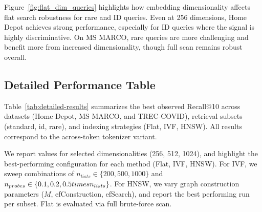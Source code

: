 \documentclass[manuscript]{acmart}
\begin{document}
Figure~\ref{fig:flat_dim_queries} highlights how embedding dimensionality affects flat search robustness for rare and ID queries. Even at 256 dimensions, Home Depot achieves strong performance, especially for ID queries where the signal is highly discriminative. On MS MARCO, rare queries are more challenging and benefit more from increased dimensionality, though full scan remains robust overall.

\subsection{Detailed Performance Table}

Table~\ref{tab:detailed-results} summarizes the best observed Recall@10 across datasets (Home Depot, MS MARCO, and TREC-COVID), retrieval subsets (standard, id, rare), and indexing strategies (Flat, IVF, HNSW). All results correspond to the across-token tokenizer variant.

We report values for selected dimensionalities (256, 512, 1024), and highlight the best-performing configuration for each method (Flat, IVF, HNSW). For IVF, we sweep combinations of $n_{lists} \in \{200, 500, 1000\}$ and $n_{probes} \in \{0.1, 0.2, 0.5 \\times n_{lists}\}$. For HNSW, we vary graph construction parameters ($M$, efConstruction, efSearch), and report the best performing run per subset. Flat is evaluated via full brute-force scan.
\end{document}
